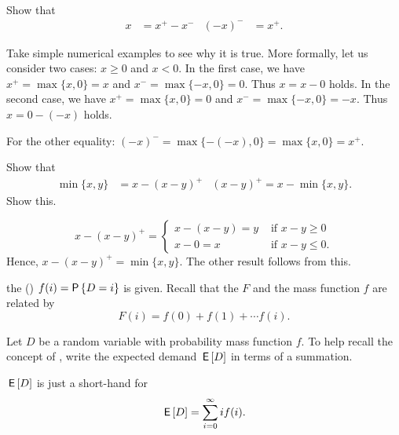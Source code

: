 \begin{exercise}
Show that
\begin{align}\label{eq:4}
 x&=x^+ - x^- &  (-x)^- &=x^+.
\end{align}
\begin{solution}
Take simple numerical examples to see why it is true. More formally, let us consider two cases: $x\geq 0$ and $x<0$. In the first case, we have $x^+=\max\{x,0\}=x$ and $x^-=\max\{-x,0\}=0$. Thus $x=x-0$ holds. In the second case, we have $x^+=\max\{x,0\}=0$ and $x^-=\max\{-x,0\}=-x$. Thus $x=0-(-x)$ holds. 

For the other equality: $(-x)^- = \max\{- (-x),0\} = \max\{x, 0\} = x^+$. 
\end{solution}
\end{exercise}

\begin{exercise}\label{ex:6}
Show that
\begin{align}
\min\{x,y\} &=  x - (x-y)^+ & (x-y)^+ = x - \min\{x, y\}.
\end{align}
Show this.
\begin{solution}
  \begin{equation*}
    x-(x-y)^+ =
    \begin{cases}
      x-(x-y) = y &\text{ if } x-y\geq 0\\
      x-0 = x &\text{ if } x-y\leq 0.
    \end{cases}
  \end{equation*}
Hence, $x-(x-y)^+ = \min\{x, y\}$. The other result follows from this. 
\end{solution}
\end{exercise}

the  () $f(i) = \P{ D = i}$ is given. Recall that the  $F$ and the mass function $f$ are related by
\begin{equation*}
F(i) = f(0)+f(1)+\cdots f(i).
\end{equation*}

\begin{exercise}\label{ex:exp} Let $D$ be a random variable with probability mass function $f$. To help recall the concept of ,
write the expected demand $\,\mathsf{E}\left[D\right]$ in terms of a summation.
  \begin{solution}
$\,\mathsf{E}\left[D\right]$ is just a short-hand for
    \begin{equation*}
      \,\mathsf{E}\left[D\right] = \sum_{i=0}^\infty i f(i).
    \end{equation*}
  \end{solution}
\end{exercise}


